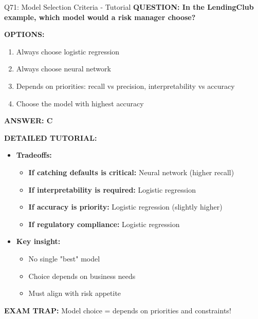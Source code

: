 \documentclass[8pt]{beamer}
\begin{document}
	\begin{frame}{Q71: Model Selection Criteria - Tutorial}
		\fontsize{6.5}{7.5}\selectfont
		\textbf{QUESTION: In the LendingClub example, which model would a risk manager choose?}
		
		\vspace{0.1cm}
		\textbf{OPTIONS:}
		\begin{enumerate}
			\item Always choose logistic regression
			\item Always choose neural network
			\item Depends on priorities: recall vs precision, interpretability vs accuracy
			\item Choose the model with highest accuracy
		\end{enumerate}
		
		\vspace{0.1cm}
		\textcolor{myblue}{\textbf{ANSWER: C}}
		
		\vspace{0.1cm}
		\textbf{DETAILED TUTORIAL:}
		\begin{itemize}
			\item \textbf{Tradeoffs:}
			\begin{itemize}
				\item \textbf{If catching defaults is critical:} Neural network (higher recall)
				\item \textbf{If interpretability is required:} Logistic regression
				\item \textbf{If accuracy is priority:} Logistic regression (slightly higher)
				\item \textbf{If regulatory compliance:} Logistic regression
			\end{itemize}
			\item \textbf{Key insight:}
			\begin{itemize}
				\item No single "best" model
				\item Choice depends on business needs
				\item Must align with risk appetite
			\end{itemize}
		\end{itemize}
		
		\textcolor{myred}{\textbf{EXAM TRAP:}} Model choice = \textcolor{myblue}{depends on priorities and constraints}!
	\end{frame}
	
\end{document}
